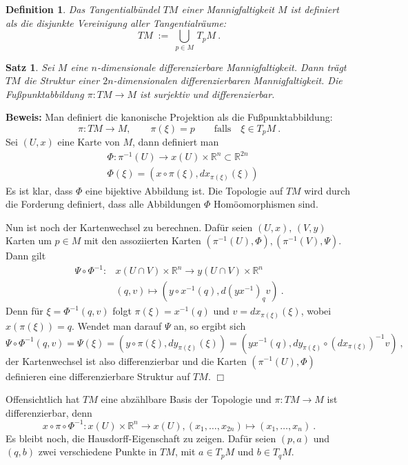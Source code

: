 \documentclass[12pt,a4paper]{article}
\def\R{\mathbb{R}}
\newtheorem{Satz}[Lemma]{Satz}
\newtheorem{Definition}[Lemma]{Definition}
\def\proof{\noindent\textbf{Beweis:}\quad}
\def\qed{\quad\hfill\ensuremath{\Box}}
\begin{document}
\begin{Definition}
Das {\em Tangentialb\"undel} $TM$ einer Mannigfaltigkeit $M$ ist definiert als die disjunkte
Vereinigung aller Tangentialr\"aume:
$$
TM \;:=\; \bigcup_{p\in M} \, T_pM \ .
$$
\end{Definition}

\bigskip

\begin{Satz}
Sei $M$ eine $n$-dimensionale differenzierbare Mannigfaltigkeit. Dann tr\"agt $TM$ die Struktur einer
$2n$-dimensionalen differenzierbaren Mannigfaltigkeit. Die Fu\ss punktabbildung $\pi: TM \rightarrow M$
ist surjektiv und differenzierbar.
\end{Satz}
\proof
Man definiert die kanonische Projektion als die Fu\ss punktabbildung:
$$
\pi : TM \rightarrow M, \qquad \pi(\xi) = p \qquad \mbox{falls}\quad \xi \in T_pM \ .
$$
Sei $(U,x)$ eine Karte von $M$, dann definiert man
$$
\begin{array}{rl}
&\Phi : \pi^{-1}(U) \rightarrow x(U) \times \R^n \subset \R^{2n}\\[1ex]
&\Phi(\xi) = (x\circ \pi (\xi), dx_{\pi(\xi)}(\xi))
\end{array}
$$
Es ist klar, dass $\Phi$ eine bijektive Abbildung ist. Die Topologie auf $TM$ wird durch
die Forderung definiert, dass alle Abbildungen $\Phi$ Hom\"oomorphismen sind.

\medskip

Nun ist noch der Kartenwechsel zu berechnen. Daf\"ur seien $(U,x),\,(V,y)$ Karten um $p\in M$
mit den assoziierten Karten  $(\pi^{-1}(U), \Phi), (\pi^{-1}(V), \Psi)$. Dann gilt
$$
\begin{array}{rl}
\Psi \circ \Phi^{-1} : & x (U \cap V) \times \R^n \rightarrow y(U\cap V) \times \R^n\\[1ex]
& (q,v) \mapsto (y\circ x^{-1}(q), d(yx^{-1})_q v) \ .
\end{array}
$$
Denn f\"ur $\xi = \Phi^{-1}(q,v)$ folgt $\pi(\xi)=x^{-1}(q)$ und $v = dx_{\pi(\xi)}(\xi)$,
wobei $x(\pi(\xi))= q$. Wendet man darauf $\Psi$ an, so ergibt sich
$$
\Psi \circ \Phi^{-1}(q, v) =\Psi(\xi) = (y\circ \pi (\xi), dy_{\pi(\xi)}(\xi))
= (yx^{-1}(q), dy_{\pi(\xi)}\circ (dx_{\pi(\xi)})^{-1}v) \ ,
$$
der Kartenwechsel ist also differenzierbar und die Karten $(\pi^{-1}(U), \Phi)$
definieren eine differenzierbare Struktur auf $TM$.
\qed

\bigskip

Offensichtlich hat $TM$ eine abz\"ahlbare Basis der Topologie und $\pi: TM \rightarrow M$
ist differenzierbar, denn
$$
x\circ \pi \circ \Phi^{-1} : x(U) \times \R^n \rightarrow x(U), (x_1,\ldots, x_{2n})\mapsto (x_1,\ldots, x_n) \ .
$$
Es bleibt noch, die Hausdorff-Eigenschaft zu zeigen. Daf\"ur seien $(p,a)$ und $(q,b)$ zwei verschiedene Punkte
in $TM$, mit $a\in T_pM$ und $b\in T_qM$.
\end{document}
